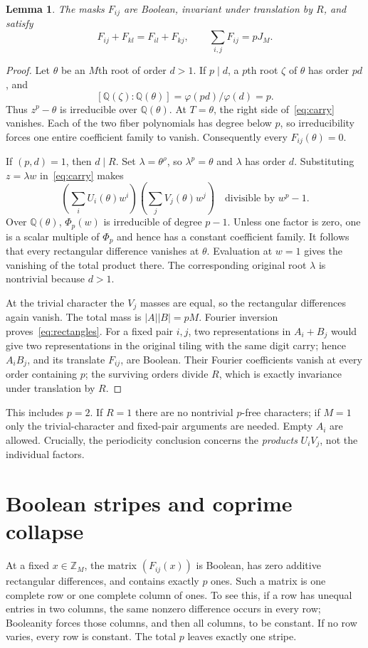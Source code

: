 \documentclass[10pt,a4paper]{amsart}
\newtheorem{lemma}[theorem]{Lemma}
\newcommand{\Z}{\mathbb Z}
\newcommand{\Q}{\mathbb Q}
\newcommand{\PhiC}{\Phi}
\begin{document}
\begin{lemma}\label{lem:products}
The masks $F_{ij}$ are Boolean, invariant under translation by $R$, and satisfy
\begin{equation}\label{eq:rectangles}
 F_{ij}+F_{kl}=F_{il}+F_{kj},\qquad
 \sum_{i,j}F_{ij}=pJ_M.
\end{equation}
\end{lemma}
\begin{proof}
Let $\theta$ be an $M$th root of order $d>1$. If $p\mid d$, a $p$th root $\zeta$ of $\theta$ has order $pd$, and
\[
 [\Q(\zeta):\Q(\theta)]=\varphi(pd)/\varphi(d)=p.
\]
Thus $z^p-\theta$ is irreducible over $\Q(\theta)$. At $T=\theta$, the right side of~\eqref{eq:carry} vanishes. Each of the two fiber polynomials has degree below $p$, so irreducibility forces one entire coefficient family to vanish. Consequently every $F_{ij}(\theta)=0$.

If $(p,d)=1$, then $d\mid R$. Set $\lambda=\theta^\rho$, so $\lambda^p=\theta$ and $\lambda$ has order $d$. Substituting $z=\lambda w$ in~\eqref{eq:carry} makes
\[
 \left(\sum_i U_i(\theta)w^i\right)
 \left(\sum_j V_j(\theta)w^j\right)
 \quad\text{divisible by }w^p-1.
\]
Over $\Q(\theta)$, $\PhiC_p(w)$ is irreducible of degree $p-1$. Unless one factor is zero, one is a scalar multiple of $\PhiC_p$ and hence has a constant coefficient family. It follows that every rectangular difference vanishes at $\theta$. Evaluation at $w=1$ gives the vanishing of the total product there. The corresponding original root $\lambda$ is nontrivial because $d>1$.

At the trivial character the $V_j$ masses are equal, so the rectangular differences again vanish. The total mass is $|A||B|=pM$. Fourier inversion proves~\eqref{eq:rectangles}. For a fixed pair $i,j$, two representations in $A_i+B_j$ would give two representations in the original tiling with the same digit carry; hence $A_iB_j$, and its translate $F_{ij}$, are Boolean. Their Fourier coefficients vanish at every order containing $p$; the surviving orders divide $R$, which is exactly invariance under translation by $R$.
\end{proof}

This includes $p=2$. If $R=1$ there are no nontrivial $p$-free characters; if $M=1$ only the trivial-character and fixed-pair arguments are needed. Empty $A_i$ are allowed. Crucially, the periodicity conclusion concerns the \emph{products} $U_iV_j$, not the individual factors.

\section{Boolean stripes and coprime collapse}
At a fixed $x\in\Z_M$, the matrix $(F_{ij}(x))$ is Boolean, has zero additive rectangular differences, and contains exactly $p$ ones. Such a matrix is one complete row or one complete column of ones. To see this, if a row has unequal entries in two columns, the same nonzero difference occurs in every row; Booleanity forces those columns, and then all columns, to be constant. If no row varies, every row is constant. The total $p$ leaves exactly one stripe.
\end{document}
